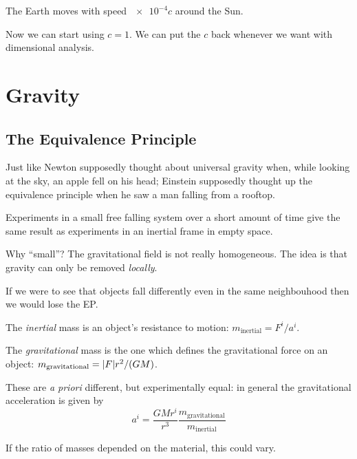 \documentclass[main.tex]{subfiles}
\begin{document}
The Earth moves with speed \(\num{e-4}  c\) around the Sun.


Now we can start using \(c=1\). We can put the \(c\) back whenever we want with dimensional analysis.

\section{Gravity}

\subsection{The Equivalence Principle}

Just like Newton supposedly thought about universal gravity when, while looking at the sky, an apple fell on his head; Einstein supposedly thought up the equivalence principle when he saw a man falling from a rooftop.

\begin{proposition}
Experiments in a small free falling system over a short amount of time give the same result as experiments in an inertial frame in empty space.
\end{proposition}

Why ``small''? The gravitational field is not really homogeneous.
The idea is that gravity can only be removed \emph{locally}.

If we were to see that objects fall differently even in the same neighbouhood then we would lose the EP.

\begin{definition}
The \emph{inertial} mass is an object's resistance to motion: \(m _{\text{inertial}} = F^{i}/ a^{i}\).
\end{definition}

\begin{definition}
The \emph{gravitational} mass is the one which defines the gravitational force on an object: \(m _{\text{gravitational}} = \abs{F} r^2 / (G M)\).
\end{definition}

These are \emph{a priori} different, but experimentally equal: in general the gravitational acceleration is given by
\begin{equation}
a^{i} = \frac{GM r^{i} }{r^3} \frac{m _{\text{gravitational}}}{m _{\text{inertial}}}  
\end{equation}

If the ratio of masses depended on the material, this could vary.
\end{document}
